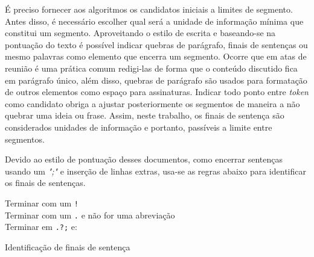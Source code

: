 	
	
	É preciso fornecer aos algoritmos os candidatos iniciais a limites de segmento. Antes disso, é necessário escolher qual será a unidade de informação mínima que constitui um segmento. Aproveitando o estilo de escrita e baseando-se na pontuação do texto é possível indicar quebras de parágrafo, finais de sentenças ou mesmo palavras como elemento que encerra um segmento. 
	Ocorre que em atas de reunião é uma prática comum redigi-las de forma que o conteúdo discutido fica em parágrafo único, além disso, quebras de parágrafo são usados para formatação de outros elementos como espaço para assinaturas. 
	Indicar todo ponto entre \textit{token} como candidato obriga a ajustar posteriormente os segmentos de maneira a não quebrar uma ideia ou frase. Assim, neste trabalho, os finais de sentença são considerados unidades de informação e portanto, passíveis a limite entre segmentos. 
	
	Devido ao estilo de pontuação desses documentos, como encerrar sentenças usando um \textit{";"} e inserção de linhas extras, usa-se as regras abaixo para identificar os finais de sentenças.  


\begin{algorithm}

	
	
	 {	

	Terminar com um \texttt{!}\\
	Terminar com um \texttt{.} e não for uma abreviação\\
	Terminar em \texttt{.?;} e:
	}
	
	\caption{Identificação de finais de sentença}
\end{algorithm}

















